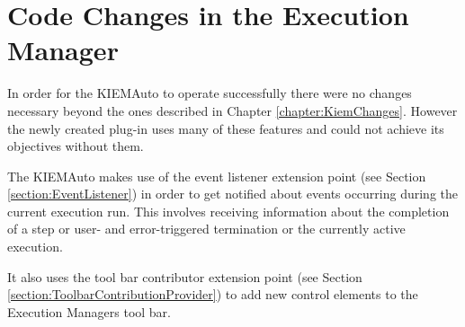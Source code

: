 \chapter{Code Changes in the Execution Manager}
\label{chapter:AutoKiemChanges}
In order for the \ac{KIEMAuto} to operate successfully there were
no changes necessary beyond the ones described in Chapter \ref{chapter:KiemChanges}. However the 
newly created plug-in uses many of these features and could not achieve its objectives without them.

The \ac{KIEMAuto} makes use of the event listener extension point 
(see Section \ref{section:EventListener}) in order to get 
notified about events occurring during the current execution run. This involves receiving information
about the completion of a step or user- and error-triggered termination or the currently active execution.

It also uses the tool bar contributor extension point (see Section \ref{section:ToolbarContributionProvider})
to add new control elements to the Execution Managers tool bar.
